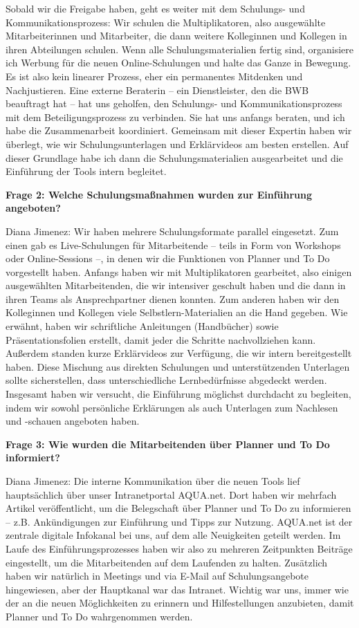 \documentclass[
    12pt, 
    a4paper,
    ]{scrartcl} %
\begin{document}
Sobald wir die Freigabe haben, geht es weiter mit dem Schulungs- und Kommunikationsprozess: Wir schulen die Multiplikatoren, also ausgewählte Mitarbeiterinnen und Mitarbeiter, die dann weitere Kolleginnen und Kollegen in ihren Abteilungen schulen. Wenn alle Schulungsmaterialien fertig sind, organisiere ich Werbung für die neuen Online-Schulungen und halte das Ganze in Bewegung. Es ist also kein linearer Prozess, eher ein permanentes Mitdenken und Nachjustieren. Eine externe Beraterin – ein Dienstleister, den die BWB beauftragt hat – hat uns geholfen, den Schulungs- und Kommunikationsprozess mit dem Beteiligungsprozess zu verbinden. Sie hat uns anfangs beraten, und ich habe die Zusammenarbeit koordiniert. Gemeinsam mit dieser Expertin haben wir überlegt, wie wir Schulungsunterlagen und Erklärvideos am besten erstellen. Auf dieser Grundlage habe ich dann die Schulungsmaterialien ausgearbeitet und die Einführung der Tools intern begleitet.

\textbf{Frage 2: Welche Schulungsmaßnahmen wurden zur Einführung angeboten?}

Diana Jimenez: Wir haben mehrere Schulungsformate parallel eingesetzt. Zum einen gab es Live-Schulungen für Mitarbeitende – teils in Form von Workshops oder Online-Sessions –, in denen wir die Funktionen von Planner und To Do vorgestellt haben. Anfangs haben wir mit Multiplikatoren gearbeitet, also einigen ausgewählten Mitarbeitenden, die wir intensiver geschult haben und die dann in ihren Teams als Ansprechpartner dienen konnten. Zum anderen haben wir den Kolleginnen und Kollegen viele Selbstlern-Materialien an die Hand gegeben. Wie erwähnt, haben wir schriftliche Anleitungen (Handbücher) sowie Präsentationsfolien erstellt, damit jeder die Schritte nachvollziehen kann. Außerdem standen kurze Erklärvideos zur Verfügung, die wir intern bereitgestellt haben. Diese Mischung aus direkten Schulungen und unterstützenden Unterlagen sollte sicherstellen, dass unterschiedliche Lernbedürfnisse abgedeckt werden. Insgesamt haben wir versucht, die Einführung möglichst durchdacht zu begleiten, indem wir sowohl persönliche Erklärungen als auch Unterlagen zum Nachlesen und -schauen angeboten haben.

\textbf{Frage 3: Wie wurden die Mitarbeitenden über Planner und To Do informiert?}

Diana Jimenez: Die interne Kommunikation über die neuen Tools lief hauptsächlich über unser Intranetportal AQUA.net. Dort haben wir mehrfach Artikel veröffentlicht, um die Belegschaft über Planner und To Do zu informieren – z.B. Ankündigungen zur Einführung und Tipps zur Nutzung. AQUA.net ist der zentrale digitale Infokanal bei uns, auf dem alle Neuigkeiten geteilt werden. Im Laufe des Einführungsprozesses haben wir also zu mehreren Zeitpunkten Beiträge eingestellt, um die Mitarbeitenden auf dem Laufenden zu halten. Zusätzlich haben wir natürlich in Meetings und via E-Mail auf Schulungsangebote hingewiesen, aber der Hauptkanal war das Intranet. Wichtig war uns, immer wie der an die neuen Möglichkeiten zu erinnern und Hilfestellungen anzubieten, damit Planner und To Do wahrgenommen werden.
\end{document}

